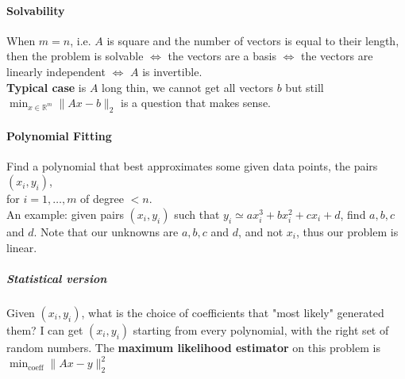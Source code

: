 \documentclass[10pt]{report}
\begin{document}
\paragraph{Solvability} When $m=n$, i.e. $A$ is square and the number of vectors is equal to their length, then the problem is solvable $\Leftrightarrow$ the vectors are a basis $\Leftrightarrow$ the vectors are linearly independent $\Leftrightarrow$ $A$ is invertible.\\
\textbf{Typical case} is $A$ long thin, we cannot get all vectors $b$ but still $\min_{x\in \mathbb{R}^m} \|Ax - b\|_2$ is a question that makes sense. 
\paragraph{Polynomial Fitting} Find a polynomial that best approximates some given data points, the pairs $(x_i,y_i)$,\\for $i=1,\ldots,m$ of degree $<n$.\\
An example: given pairs $(x_i, y_i)$ such that $y_i \simeq ax_i^3 + bx_i^2 + cx_i + d$, find $a,b,c$ and $d$. Note that our unknowns are $a,b,c$ and $d$, and not $x_i$, thus our problem is linear.
\subparagraph{Statistical version} Given $(x_i, y_i)$, what is the choice of coefficients that "most likely" generated them? I can get $(x_i, y_i)$ starting from every polynomial, with the right set of random numbers. The \textbf{maximum likelihood estimator} on this problem is $\min_{\text{coeff}}\|Ax - y\|_2^2$
\end{document}
